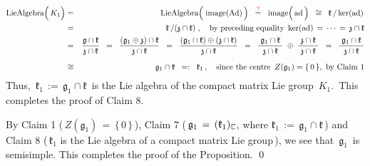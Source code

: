 \begin{eqnarray*}
\textnormal{LieAlgebra}\!\left(\,\overset{{\color{white}.}}{K_{1}}\right)
& = &
    \textnormal{LieAlgebra}\!\left(\;\overset{{\color{white}.}}{\image(\Ad)}\,\right)
\;\; \overset{{\color{red}?}}{=} \;\;
    \image\!\left(\,\overset{{\color{white}.}}{\ad}\,\right)
\;\; \cong \;\;
    \mathfrak{k} \left\slash\, \ker(\ad)\right.
\\
& = &
    \mathfrak{k} \left\slash (\mathfrak{z} \cap \mathfrak{k})\right.,
    \quad
    \textnormal{by preceding equality \,$\ker(\ad) \,=\, \cdots \,=\, \mathfrak{z} \cap \mathfrak{k}$}
\\
& = &
    \dfrac{
        \mathfrak{g} \cap \mathfrak{k}
        }{
        \mathfrak{z}\cap\mathfrak{k}
        }
\;\; = \;\;
    \dfrac{
        (\mathfrak{g}_{1}\oplus\mathfrak{z}) \cap \mathfrak{k}
        }{
        \mathfrak{z}\cap\mathfrak{k}
        }
\;\; = \;\;
    \dfrac{
        (\mathfrak{g}_{1}\cap\mathfrak{k}) \oplus (\mathfrak{z}\cap\mathfrak{k})
        }{
        \mathfrak{z}\cap\mathfrak{k}
        }
\;\; = \;\;
    \dfrac{
        {\color{white}.}
        \mathfrak{g}_{1}\cap\mathfrak{k}
        {\color{white}.}
        }{
        \mathfrak{z}\cap\mathfrak{k}
        }
    \; \oplus \;
    \dfrac{
        {\color{white}.}
        \mathfrak{z}\cap\mathfrak{k}
        {\color{white}.}
        }{
        \mathfrak{z}\cap\mathfrak{k}
        }
\;\; = \;\;
    \dfrac{
        {\color{white}.}
        \mathfrak{g}_{1}\cap\mathfrak{k}
        {\color{white}.}
        }{
        \mathfrak{z}\cap\mathfrak{k}
        }
\\
& \overset{{\color{white}?}}{\cong} &
    \mathfrak{g}_{1} \cap \mathfrak{k}
\;\; =: \;\;
    \mathfrak{k}_{1}\,,
    \quad
    \textnormal{since the centre \,$Z(\mathfrak{g}_{1}) = \{\,0\,\}$,\, by Claim 1}
\end{eqnarray*}
Thus,
\,$\mathfrak{k}_{1} \,:=\, \mathfrak{g}_{1} \cap \mathfrak{k}$\,
is the Lie algebra of the compact matrix Lie group \,$K_{1}$.\,
This completes the proof of Claim 8.

\vskip 0.2cm
\noindent
By Claim 1 (\,$Z(\mathfrak{g}_{1}) \,=\, \{\,0\,\}$\,),
Claim 7 (\,$\mathfrak{g}_{1} \,=\, (\mathfrak{k}_{1})_{\mathbb{C}}$,
where $\mathfrak{k}_{1} \,:=\, \mathfrak{g}_{1} \cap \mathfrak{k}$\,) and
Claim 8 (\,$\mathfrak{k}_{1}$ is the Lie algebra of a compact matrix Lie group\,),
we see that \,$\mathfrak{g}_{1}$\, is semisimple.
This completes the proof of the Proposition.
\qed


